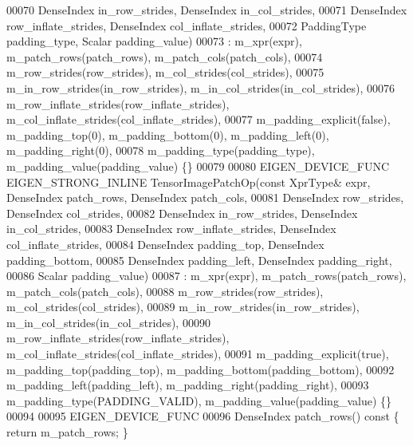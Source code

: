 \begin{DoxyCode}
00070                                                            DenseIndex in\_row\_strides, DenseIndex 
      in\_col\_strides,
00071                                                            DenseIndex row\_inflate\_strides, DenseIndex 
      col\_inflate\_strides,
00072                                                            PaddingType padding\_type, Scalar padding\_value)
00073       : m\_xpr(expr), m\_patch\_rows(patch\_rows), m\_patch\_cols(patch\_cols),
00074         m\_row\_strides(row\_strides), m\_col\_strides(col\_strides),
00075         m\_in\_row\_strides(in\_row\_strides), m\_in\_col\_strides(in\_col\_strides),
00076         m\_row\_inflate\_strides(row\_inflate\_strides), m\_col\_inflate\_strides(col\_inflate\_strides),
00077         m\_padding\_explicit(false), m\_padding\_top(0), m\_padding\_bottom(0), m\_padding\_left(0), 
      m\_padding\_right(0),
00078         m\_padding\_type(padding\_type), m\_padding\_value(padding\_value) \{\}
00079 
00080   EIGEN\_DEVICE\_FUNC EIGEN\_STRONG\_INLINE TensorImagePatchOp(\textcolor{keyword}{const} XprType& expr, DenseIndex patch\_rows, 
      DenseIndex patch\_cols,
00081                                                            DenseIndex row\_strides, DenseIndex col\_strides,
00082                                                            DenseIndex in\_row\_strides, DenseIndex 
      in\_col\_strides,
00083                                                            DenseIndex row\_inflate\_strides, DenseIndex 
      col\_inflate\_strides,
00084                                                            DenseIndex padding\_top, DenseIndex 
      padding\_bottom,
00085                                                            DenseIndex padding\_left, DenseIndex 
      padding\_right,
00086                                                            Scalar padding\_value)
00087       : m\_xpr(expr), m\_patch\_rows(patch\_rows), m\_patch\_cols(patch\_cols),
00088         m\_row\_strides(row\_strides), m\_col\_strides(col\_strides),
00089         m\_in\_row\_strides(in\_row\_strides), m\_in\_col\_strides(in\_col\_strides),
00090         m\_row\_inflate\_strides(row\_inflate\_strides), m\_col\_inflate\_strides(col\_inflate\_strides),
00091         m\_padding\_explicit(true), m\_padding\_top(padding\_top), m\_padding\_bottom(padding\_bottom),
00092         m\_padding\_left(padding\_left), m\_padding\_right(padding\_right),
00093         m\_padding\_type(PADDING\_VALID), m\_padding\_value(padding\_value) \{\}
00094 
00095     EIGEN\_DEVICE\_FUNC
00096     DenseIndex patch\_rows()\textcolor{keyword}{ const }\{ \textcolor{keywordflow}{return} m\_patch\_rows; \}

\end{DoxyCode}
